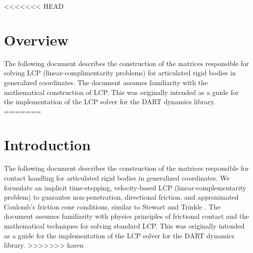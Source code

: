 <<<<<<< HEAD
\section{Overview}
The following document describes the construction of the matrices responsible for solving LCP (linear-complimentarity problems) for articulated rigid bodies in generalized coordinates. The document assumes familiarity with the mathematical construction of LCP. This was originally intended as a guide for the implementation of the LCP solver for the DART dynamics library.
=======
\section{Introduction}
The following document describes the construction of the matrices responsible for contact handling for articulated rigid bodies in generalized coordinates. We formulate an implicit time-stepping, velocity-based LCP (linear-complementarity problem) to guarantee non-penetration, directional friction, and approximated Coulomb’s friction cone conditions, similar to Stewart and Trinkle \cite{Stewart:1996}. The document assumes familiarity with physics principles of frictional contact and the mathematical techniques for solving standard LCP. This was originally intended as a guide for the implementation of the LCP solver for the DART dynamics library.
>>>>>>> karen
